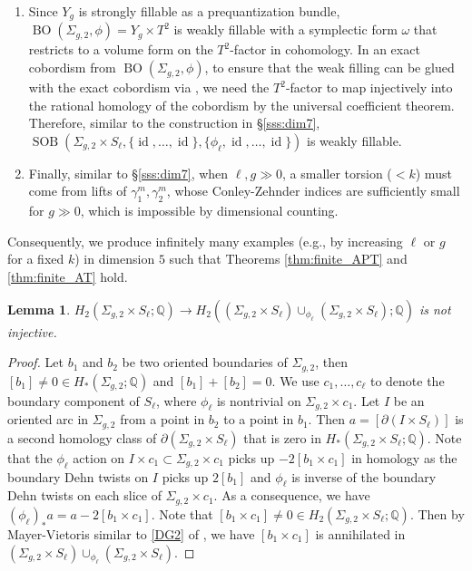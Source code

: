 \documentclass[11pt]{amsart}
\numberwithin{equation}{section}
\newtheorem{lemma}[theorem]{\textbf{Lemma}}
\def\Q{{\mathbb Q}}
\DeclareMathOperator{\Id}{id}
\DeclareMathOperator{\BO}{BO}
\DeclareMathOperator{\SOB}{SOB}
\begin{document}
\begin{enumerate}
    \item Since $Y_g$ is strongly fillable as a prequantization bundle, $\BO(\Sigma_{g,2},\phi)=Y_g\times T^2$ is weakly fillable with a symplectic form $\omega$ that restricts to a volume form on the $T^2$-factor in cohomology. In an exact cobordism from $\BO(\Sigma_{g,2},\phi)$, to ensure that the weak filling can be glued with the exact cobordism via , we need the $T^2$-factor to map injectively into the rational homology of the cobordism by the universal coefficient theorem. Therefore, similar to the construction in \S \ref{sss:dim7}, $\SOB(\Sigma_{g,2}\times S_{\ell}, \{\Id,\ldots,\Id\}, \{\phi_{\ell},\Id,\ldots,\Id\})$ is weakly fillable. 
    \item Finally, similar to \S \ref{sss:dim7}, when $\ell, g \gg 0$, a smaller torsion ($<k$) must come from lifts of $\gamma^m_1,\gamma^m_2$, whose Conley-Zehnder indices are sufficiently small for $g\gg 0$, which is impossible by dimensional counting. 
\end{enumerate}
Consequently, we produce infinitely many examples (e.g., by increasing $\ell$ or $g$ for a fixed $k$) in dimension $5$ such that Theorems \ref{thm:finite_APT} and \ref{thm:finite_AT} hold.

\begin{lemma}\label{lemma:not_inj}
$H_2(\Sigma_{g,2}\times S_{\ell};\Q)\to H_2((\Sigma_{g,2}\times S_{\ell})\cup_{\phi_{\ell}}(\Sigma_{g,2}\times S_{\ell});\Q)$ is not injective. 
\end{lemma}
\begin{proof}
    Let $b_1$ and $b_2$ be two oriented boundaries of $\Sigma_{g,2}$, then $[b_1]\ne 0 \in H_*(\Sigma_{g,2};\Q)$ and $[b_1]+[b_2]=0$. We use $c_1,\ldots,c_{\ell}$ to denote the boundary component of $S_{\ell}$, where $\phi_{\ell}$ is nontrivial on $\Sigma_{g,2}\times c_1$. Let $I$ be an oriented arc in $\Sigma_{g,2}$ from a point in $b_2$ to a point in $b_1$. Then $a=[\partial(I\times S_{\ell})]$ is a second homology class of $\partial(\Sigma_{g,2}\times S_{\ell})$ that is zero in $H_*(\Sigma_{g,2}\times S_{\ell};\Q)$. Note that the $\phi_{\ell}$ action on $I\times c_1\subset \Sigma_{g,2}\times c_1$ picks up $-2[b_1\times c_1]$ in homology as the boundary Dehn twists on $I$ picks up $2[b_1]$ and $\phi_{\ell}$ is inverse of the boundary Dehn twists on each slice of $\Sigma_{g,2}\times c_1$. As a consequence, we have $(\phi_{\ell})_*a=a-2[b_1\times c_1]$. Note that $[b_1\times c_1]\ne 0\in H_2(\Sigma_{g,2}\times S_{\ell};\Q)$. Then by Mayer-Vietoris similar to \eqref{DG2} of , we have $[b_1\times c_1]$ is annihilated in $(\Sigma_{g,2}\times S_{\ell})\cup_{\phi_{\ell}}(\Sigma_{g,2}\times S_{\ell})$.
\end{proof}
\end{document}
